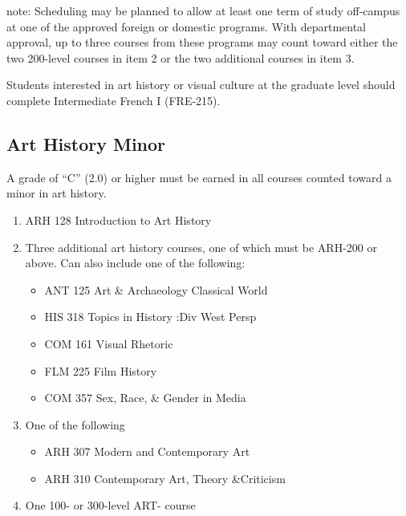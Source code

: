 \documentclass[
  letterpaper,
]{scrbook}
\providecommand{\tightlist}{%
  \setlength{\itemsep}{0pt}\setlength{\parskip}{0pt}}
\begin{document}
note: Scheduling may be planned to allow at least one term of study
off-campus at one of the approved foreign or domestic programs. With
departmental approval, up to three courses from these programs may count
toward either the two 200-level courses in item 2 or the two additional
courses in item 3.

Students interested in art history or visual culture at the graduate
level should complete Intermediate French I (FRE-215).

\subsection{Art History Minor}\label{art-history-minor}

A grade of ``C'' (2.0) or higher must be earned in all courses counted
toward a minor in art history.

\begin{enumerate}
\def\labelenumi{\arabic{enumi}.}
\tightlist
\item
  ARH 128 Introduction to Art History\\
\item
  Three additional art history courses, one of which must be ARH-200 or
  above. Can also include one of the following:

  \begin{itemize}
  \tightlist
  \item
    ANT 125 Art \& Archaeology Classical World\\
  \item
    HIS 318 Topics in History :Div West Persp\\
  \item
    COM 161 Visual Rhetoric\\
  \item
    FLM 225 Film History\\
  \item
    COM 357 Sex, Race, \& Gender in Media\\
  \end{itemize}
\item
  One of the following

  \begin{itemize}
  \tightlist
  \item
    ARH 307 Modern and Contemporary Art
  \item
    ARH 310 Contemporary Art, Theory \&Criticism\\
  \end{itemize}
\item
  One 100- or 300-level ART- course
\end{enumerate}
\end{document}
